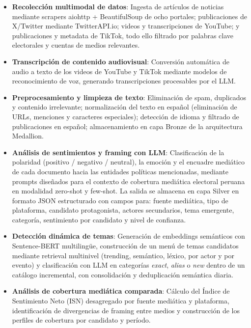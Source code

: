 \begin{itemize}
    \item \textbf{Recolección multimodal de datos}: Ingesta de artículos de noticias mediante scrapers aiohttp + BeautifulSoup de ocho portales; publicaciones de X/Twitter mediante TwitterAPI.io; videos y transcripciones de YouTube; y publicaciones y metadata de TikTok, todo ello filtrado por palabras clave electorales y cuentas de medios relevantes.

    \item \textbf{Transcripción de contenido audiovisual}: Conversión automática de audio a texto de los videos de YouTube y TikTok mediante modelos de reconocimiento de voz, generando transcripciones procesables por el LLM.

    \item \textbf{Preprocesamiento y limpieza de texto}: Eliminación de spam, duplicados y contenido irrelevante; normalización del texto en español (eliminación de URLs, menciones y caracteres especiales); detección de idioma y filtrado de publicaciones en español; almacenamiento en capa Bronze de la arquitectura Medallion.

    \item \textbf{Análisis de sentimientos y framing con LLM}: Clasificación de la polaridad (positivo / negativo / neutral), la emoción y el encuadre mediático de cada documento hacia las entidades políticas mencionadas, mediante prompts diseñados para el contexto de cobertura mediática electoral peruana en modalidad zero-shot y few-shot. La salida se almacena en capa Silver en formato JSON estructurado con campos para: fuente mediática, tipo de plataforma, candidato protagonista, actores secundarios, tema emergente, categoría, sentimiento por candidato y nivel de confianza.

    \item \textbf{Detección dinámica de temas}: Generación de embeddings semánticos con Sentence-BERT multilingüe, construcción de un menú de temas candidatos mediante retrieval multinivel (trending, semántico, léxico, por actor y por evento) y clasificación con LLM en categorías \textit{exact}, \textit{alias} o \textit{new} dentro de un catálogo incremental, con consolidación y deduplicación semántica diaria.

    \item \textbf{Análisis de cobertura mediática comparada}: Cálculo del Índice de Sentimiento Neto (ISN) desagregado por fuente mediática y plataforma, identificación de divergencias de framing entre medios y construcción de los perfiles de cobertura por candidato y período.


\end{itemize}
